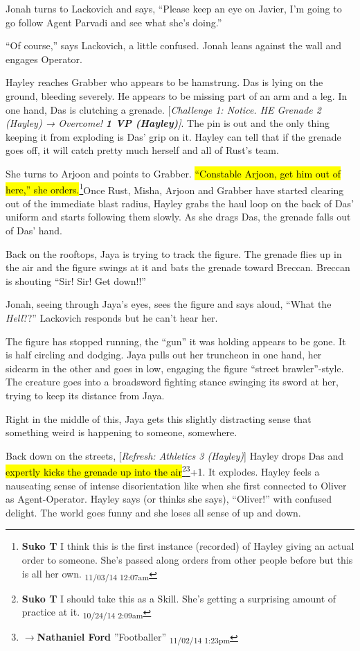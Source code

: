 Jonah turns to Lackovich and says, ``Please keep an eye on Javier, I'm going to go follow Agent Parvadi and see what she's doing.''

``Of course,'' says Lackovich, a little confused.   Jonah leans against the wall and engages Operator.



Hayley reaches Grabber who appears to be hamstrung.  Das is lying on the ground, bleeding severely.  He appears to be missing part of an arm and a leg.  In one hand, Das is clutching a grenade.  {[}\textit{Challenge 1: Notice.  HE Grenade 2 (Hayley) → Overcome! }\textit{\textbf{1 VP (Hayley)}}\textit{{]}}.  The pin is out and the only thing keeping it from exploding is Das' grip on it.  Hayley can tell that if the grenade goes off, it will catch pretty much herself and all of Rust's team.

She turns to Arjoon and points to Grabber.  \hl{``Constable Arjoon, get him out of here,'' she orders.}\footnote{\textbf{Suko T }I think this is the first instance (recorded) of Hayley giving an actual order to someone.  She's passed along orders from other people before but this is all her own. \textsubscript{11/03/14 12:07am}}Once Rust, Misha, Arjoon and Grabber have started clearing out of the immediate blast radius, Hayley grabs the haul loop on the back of Das' uniform and starts following them slowly.  As she drags Das, the grenade falls out of Das' hand. 



Back on the rooftops, Jaya is trying to track the figure.  The grenade flies up in the air and the figure swings at it and bats the grenade toward Breccan.  Breccan is shouting ``Sir!  Sir!  Get down!!''

Jonah, seeing through Jaya's eyes, sees the figure and says aloud, ``What the \textit{Hell}??''  Lackovich responds but he can't hear her.

The figure has stopped running, the ``gun'' it was holding appears to be gone.  It is half circling and dodging.  Jaya pulls out her truncheon in one hand, her sidearm in the other and goes in low, engaging the figure ``street brawler''-style.  The creature goes into a broadsword fighting stance swinging its sword at her, trying to keep its distance from Jaya.

Right in the middle of this, Jaya gets this slightly distracting sense that something weird is happening to someone, somewhere.



Back down on the streets, {[}\textit{Refresh: Athletics 3 (Hayley)}{]} Hayley drops Das and \hl{expertly kicks the grenade up into the air}\footnote{\textbf{Suko T }I should take this as a Skill.  She's getting a surprising amount of practice at it. \textsubscript{10/24/14 2:09am}}\footnote{$\rightarrow$\textbf{Nathaniel Ford }''Footballer'' \textsubscript{11/02/14 1:23pm}}+1.  It explodes.  Hayley feels a nauseating sense of intense disorientation like when she first connected to Oliver as Agent-Operator.  Hayley says (or thinks she says), ``Oliver!'' with confused delight.  The world goes funny and she loses all sense of up and down.  

